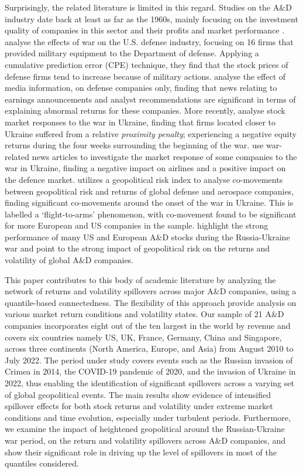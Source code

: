 \documentclass[
  number]{elsarticle}
\begin{document}
Surprisingly, the related literature is limited in this regard. Studies
on the A\&D industry date back at least as far as the 1960s, mainly
focusing on the investment quality of companies in this sector
\citep{butler1966, butler1966a, butler1967} and their profits and market
performance \citep{agapos1970, suarez1976, bohi1973}.
\citep{mcdonald2011} analyse the effects of war on the U.S. defense
industry, focusing on 16 firms that provided military equipment to the
Department of defense. Applying a cumulative prediction error (CPE)
technique, they find that the stock prices of defense firms tend to
increase because of military actions. \citep{Cappelle.2008} analyse the
effect of media information, on defense companies only, finding that
news relating to earnings announcements and analyst recommendations are
significant in terms of explaining abnormal returns for these companies.
More recently, \citep{federle2022} analyse stock market responses to the
war in Ukraine, finding that firms located closer to Ukraine suffered
from a relative \emph{proximity penalty}; experiencing a negative equity
returns during the four weeks surrounding the beginning of the war.
\citep{le2022Le} use war-related news articles to investigate the market
response of some companies to the war in Ukraine, finding a negative
impact on airlines and a positive impact on the defence market.
\citep{zhang2022} utilizes a geopolitical risk index to analyse
co-movements between geopolitical risk and returns of global defense and
aerospace companies, finding significant co-movements around the onset
of the war in Ukraine. This is labelled a `flight-to-arms' phenomenon,
with co-movement found to be significant for more European and US
companies in the sample. \citep{kumar2022} highlight the strong
performance of many US and European A\&D stocks during the
Russia-Ukraine war and point to the strong impact of geopolitical risk
on the returns and volatility of global A\&D companies.

This paper contributes to this body of academic literature by analyzing
the network of returns and volatility spillovers across major A\&D
companies, using a quantile-based connectedness. The flexibility of this
approach provide analysis on various market return conditions and
volatility states. Our sample of 21 A\&D companies incorporates eight
out of the ten largest in the world by revenue and covers six countries
namely US, UK, France, Germany, China and Singapore, across three
continents (North America, Europe, and Asia) from August 2010 to July
2022. The period under study covers events such as the Russian invasion
of Crimea in 2014, the COVID-19 pandemic of 2020, and the invasion of
Ukraine in 2022, thus enabling the identification of significant
spillovers across a varying set of global geopolitical events. The main
results show evidence of intensified spillover effects for both stock
returns and volatility under extreme market conditions and time
evolution, especially under turbulent periods. Furthermore, we examine
the impact of heightened geopolitical around the Russian-Ukraine war
period, on the return and volatility spillovers across A\&D companies,
and show their significant role in driving up the level of spillovers in
most of the quantiles considered.
\end{document}
